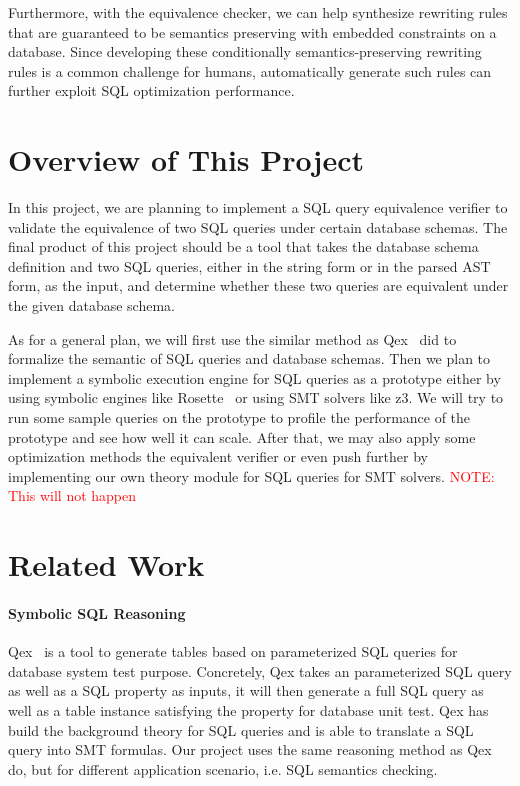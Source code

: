 \documentclass{article}
\newcommand\note[1]{\textcolor{red}{NOTE: #1}}
\begin{document}
Furthermore, with the equivalence checker, we can help synthesize rewriting rules that are guaranteed to be semantics preserving with embedded constraints on a database. Since developing these conditionally semantics-preserving rewriting rules is a common challenge for humans, automatically generate such rules can further exploit SQL optimization performance.

\section{Overview of This Project}
In this project, we are planning to implement a SQL query equivalence verifier
to validate the equivalence of two SQL queries under certain database schemas.
The final product of this project should be a tool that takes the database schema
definition and two SQL queries, either in the string form or in the parsed AST form, 
as the input, and determine whether these two queries are equivalent under the given
database schema.

As for a general plan, we will first use the similar method as Qex~\cite{veanes2010qex,veanes2009symbolic} did
to formalize the semantic of SQL queries and database schemas.
Then we plan to implement a symbolic execution engine for SQL queries as a prototype 
either by using symbolic engines like Rosette~\cite{torlak2014lightweight} 
or using SMT solvers like z3.
We will try to run some sample queries on the prototype to profile the performance of the
prototype and see how well it can scale.
After that, we may also apply some optimization methods the equivalent verifier 
or even push further by implementing our own theory module for SQL queries for SMT solvers.
\note{This will not happen}



\section{Related Work}

\paragraph{Symbolic SQL Reasoning} Qex~\cite{veanes2010qex,veanes2009symbolic} is a tool to generate tables based on parameterized SQL queries for database system test purpose. Concretely, Qex takes an parameterized SQL query as well as a SQL property as inputs, it will then generate a full SQL query as well as a table instance satisfying the property for database unit test. Qex has build the background theory for SQL queries and is able to translate a SQL query into SMT formulas. Our project uses the same reasoning method as Qex do, but for different application scenario, i.e. SQL semantics checking.
\end{document}
